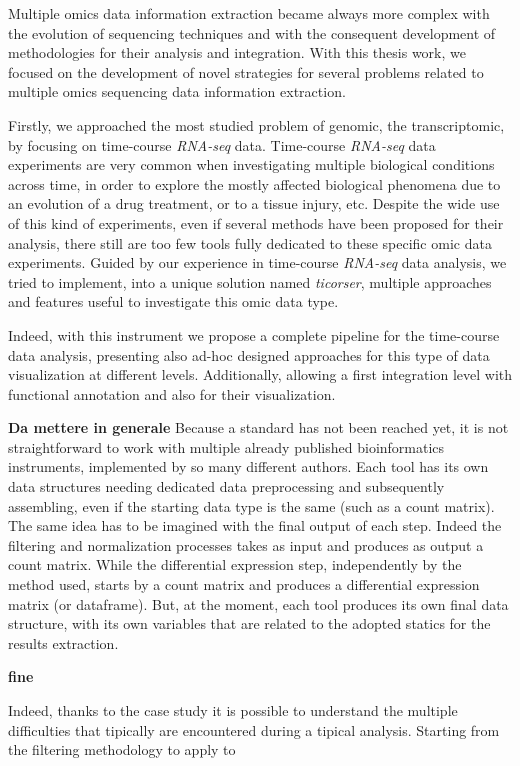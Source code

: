 Multiple omics data information extraction became always more complex with the evolution of sequencing techniques and with the consequent development of methodologies for their analysis and integration.
With this thesis work, we focused on the development of novel strategies for several problems related to multiple omics sequencing data information extraction.

Firstly, we approached the most studied problem of genomic, the transcriptomic, by focusing on time-course \textit{RNA-seq} data.
Time-course \textit{RNA-seq} data experiments are very common when investigating multiple biological conditions across time, in order to explore the mostly affected biological phenomena due to an evolution of a drug treatment, or to a tissue injury, etc.
Despite the wide use of this kind of experiments, even if several methods have been proposed for their analysis, there still are too few tools fully dedicated to these specific omic data experiments.
Guided by our experience in time-course \textit{RNA-seq} data analysis, we tried to implement, into a unique solution named \textit{ticorser}, multiple approaches and features useful to investigate this omic data type.

Indeed, with this instrument we propose a complete pipeline for the time-course data analysis, presenting also ad-hoc designed approaches for this type of data visualization at different levels.
Additionally, allowing a first integration level with functional annotation and also for their visualization.

\textbf{Da mettere in generale}
Because a standard has not been reached yet, it is not straightforward to work with multiple already published bioinformatics instruments, implemented by so many different authors.
Each tool has its own data structures needing dedicated data preprocessing and subsequently assembling, even if the starting data type is the same (such as a count matrix).
The same idea has to be imagined with the final output of each step.
Indeed the filtering and normalization processes takes as input and produces as output a count matrix.
While the differential expression step, independently by the method used, starts by a count matrix and produces a differential expression matrix (or dataframe).
But, at the moment, each tool produces its own final data structure, with its own variables that are related to the adopted statics for the results extraction.

\textbf{fine}


Indeed, thanks to the case study it is possible to understand the multiple difficulties that tipically are encountered during a tipical analysis.
Starting from the filtering methodology to apply to 

